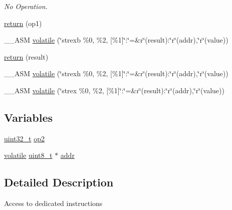 \begin{DoxyCompactItemize}
\begin{DoxyCompactList}\small\item\em No Operation. \end{DoxyCompactList}\item 
\hyperlink{group___c_m_s_i_s___core___instruction_interface_gab9058611fde15cb40f6e7718deef51ad}{return} (op1)
\item 
\-\_\-\-\_\-\-A\-S\-M \hyperlink{group___c_m_s_i_s___core___instruction_interface_ga07f432095752f64c94d8ad10c23c3f15}{volatile} (\char`\"{}strexb \%0, \%2, \mbox{[}\%1\mbox{]}\char`\"{}\-:\char`\"{}=\&r\char`\"{}(result)\-:\char`\"{}r\char`\"{}(addr),\char`\"{}r\char`\"{}(value))
\item 
\hyperlink{group___c_m_s_i_s___core___instruction_interface_ga0705cb6b31823e7d40c6e0046a1472aa}{return} (result)
\item 
\-\_\-\-\_\-\-A\-S\-M \hyperlink{group___c_m_s_i_s___core___instruction_interface_ga174ca03e9899621ed59c211c6168da69}{volatile} (\char`\"{}strexh \%0, \%2, \mbox{[}\%1\mbox{]}\char`\"{}\-:\char`\"{}=\&r\char`\"{}(result)\-:\char`\"{}r\char`\"{}(addr),\char`\"{}r\char`\"{}(value))
\item 
\-\_\-\-\_\-\-A\-S\-M \hyperlink{group___c_m_s_i_s___core___instruction_interface_gad7d93af13046b0378601b85c8c16673b}{volatile} (\char`\"{}strex \%0, \%2, \mbox{[}\%1\mbox{]}\char`\"{}\-:\char`\"{}=\&r\char`\"{}(result)\-:\char`\"{}r\char`\"{}(addr),\char`\"{}r\char`\"{}(value))
\end{DoxyCompactItemize}
\subsection*{Variables}
\begin{DoxyCompactItemize}
\item 
\hyperlink{stdint_8h_a435d1572bf3f880d55459d9805097f62}{uint32\-\_\-t} \hyperlink{group___c_m_s_i_s___core___instruction_interface_gadb2bb33809b6f35ba4d176cbec7c7b75}{op2}
\item 
\hyperlink{group___c_m_s_i_s___core___instruction_interface_gad7d93af13046b0378601b85c8c16673b}{volatile} \hyperlink{stdint_8h_aba7bc1797add20fe3efdf37ced1182c5}{uint8\-\_\-t} $\ast$ \hyperlink{group___c_m_s_i_s___core___instruction_interface_gae5c31572d72f992f107a67f7c4e80d5b}{addr}
\end{DoxyCompactItemize}


\subsection{Detailed Description}
Access to dedicated instructions 

